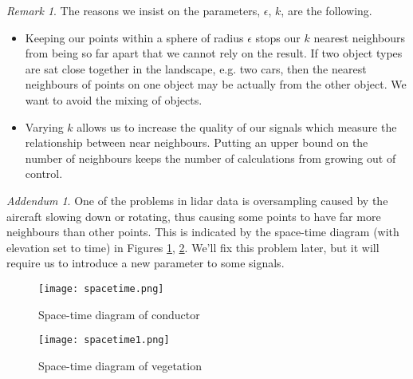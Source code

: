 \documentclass[a4paper,11pt,twoside]{article}
\theoremstyle{definition}
\theoremstyle{remark}
\newtheorem{rmk}[thm]{Remark}
\newtheorem{addendum}[thm]{Addendum}
\begin{document}
\begin{rmk}The reasons we insist on the parameters, $\epsilon$, $k$, are the following.
\begin{itemize}
\item Keeping our points within a sphere of radius $\epsilon$ stops our $k$ nearest neighbours from being so far apart that we cannot rely on the result. If two object types are sat close together in the landscape, e.g. two cars, then the nearest neighbours of points on one object may be actually from the other object. We want to avoid the mixing of objects.
\item Varying $k$ allows us to increase the quality of our signals which measure the relationship between near neighbours.  Putting an upper bound on the number of neighbours keeps the number of calculations from growing out of control.
\end{itemize}
\end{rmk}
\begin{addendum}\label{add}One of the problems in lidar data is oversampling caused by the aircraft slowing down or rotating, thus causing some points to have far more neighbours than other points. This is indicated by the space-time diagram (with elevation set to time) in Figures \hyperref[spacetime]{\ref*{spacetime}}, \hyperref[spacetime]{\ref*{spacetime1}}. We'll fix this problem later, but it will require us to introduce a new parameter to some signals.
\end{addendum}
\newpage
\begin{figure}[!h]
  \caption{Space-time diagram of conductor}
  \centering
    \texttt{[image: spacetime.png]}
    \label{spacetime}
\end{figure}
\begin{figure}[!h]
  \caption{Space-time diagram of vegetation}
  \centering
    \texttt{[image: spacetime1.png]}
    \label{spacetime1}
\end{figure}
\newpage
\end{document}
